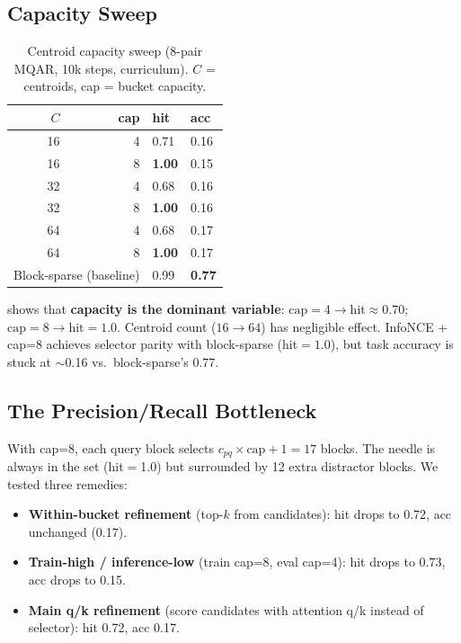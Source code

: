 \documentclass[10pt,letterpaper]{article}
\begin{document}
\subsection{Capacity Sweep}

\begin{table}[h]
\centering
\caption{Centroid capacity sweep (8-pair MQAR, 10k steps, curriculum).
$C$ = centroids, cap = bucket capacity.}
\label{tab:centroid}
\small
\begin{tabular}{rrll}
\toprule
$C$ & cap & hit & acc \\
\midrule
16 & 4 & 0.71 & 0.16 \\
16 & 8 & \textbf{1.00} & 0.15 \\
32 & 4 & 0.68 & 0.16 \\
32 & 8 & \textbf{1.00} & 0.16 \\
64 & 4 & 0.68 & 0.17 \\
64 & 8 & \textbf{1.00} & 0.17 \\
\midrule
\multicolumn{2}{r}{Block-sparse (baseline)} & 0.99 & \textbf{0.77} \\
\bottomrule
\end{tabular}
\end{table}

 shows that \textbf{capacity is the dominant variable}:
$\text{cap}=4 \to \text{hit} \approx 0.70$; $\text{cap}=8 \to \text{hit}=1.0$.
Centroid count ($16 \to 64$) has negligible effect. InfoNCE + cap=8 achieves
selector parity with block-sparse (hit$=1.0$), but task accuracy is stuck at
$\sim$0.16 vs.\ block-sparse's 0.77.

\subsection{The Precision/Recall Bottleneck}

With cap=8, each query block selects $c_{pq} \times \text{cap} + 1 = 17$
blocks. The needle is always in the set (hit$=$1.0) but surrounded by 12
extra distractor blocks. We tested three remedies:

\begin{itemize}[leftmargin=*,itemsep=2pt]
\item \textbf{Within-bucket refinement} (top-$k$ from candidates): hit drops
  to 0.72, acc unchanged (0.17).
\item \textbf{Train-high / inference-low} (train cap=8, eval cap=4): hit
  drops to 0.73, acc drops to 0.15.
\item \textbf{Main q/k refinement} (score candidates with attention q/k
  instead of selector): hit 0.72, acc 0.17.
\end{itemize}
\end{document}
